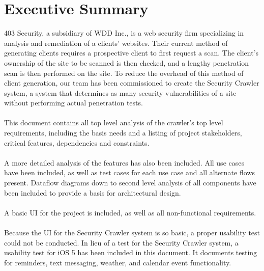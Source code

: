 \section{Executive Summary}
403 Security, a subsidiary of WDD Inc., is a web security firm specializing in analysis and remediation of a clients' websites.  Their current method of generating clients requires a prospective client to first request a scan.  The client's ownership of the site to be scanned is then checked, and a lengthy penetration scan is then performed on the site.  To reduce the overhead of this method of client generation, our team has been commissioned to create the Security Crawler system, a system that determines as many security vulnerabilities of a site without performing actual penetration tests.\\\\
This document contains all top level analysis of the crawler's top level requirements, including the basis needs and a listing of project stakeholders, critical features, dependencies and constraints. \\\\
A more detailed analysis of the features has also been included.  All use cases have been included, as well as test cases for each use case and all alternate flows present.  Dataflow diagrams down to second level analysis of all components have been included to provide a basis for architectural design.\\\\
A basic UI for the project is included, as well as all non-functional requirements.\\\\
Because the UI for the Security Crawler system is so basic, a proper usability test could not be conducted.  In lieu of a test for the Security Crawler system, a usability test for iOS 5 has been included in this document.  It documents testing for reminders, text messaging, weather, and calendar event functionality.
